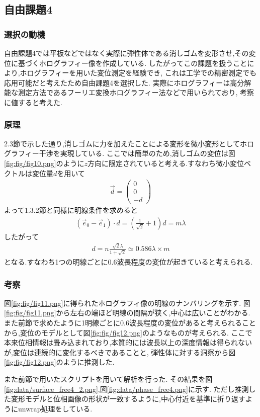 \subsection{自由課題4}
\subsubsection{選択の動機}
自由課題4では平板などではなく実際に弾性体である消しゴムを変形させ,その変位に基づくホログラフィー像を作成している.
したがってこの課題を扱うことにより,ホログラフィーを用いた変位測定を経験でき,
これは工学での精密測定でも応用可能だと考えたため自由課題4を選択した.
実際にホログラフィーは高分解能な測定方法であるフーリエ変換ホログラフィー法などで用いられており,
考察に値すると考えた.\cite{ja64:online}
\newpage
\subsubsection{原理}
2.3節で示した通り,消しゴムに力を加えたことによる変形を微小変形としてホログラフィー干渉を実現している.
ここでは簡単のため,消しゴムの変位は図\ref{fig:fig/fig10.png}のように$z$方向に限定されていると考える.すなわち微小変位ベクトルは変位量$d$を用いて
\begin{align}
  \vec{d}=\left(\begin{array}{c}
    0\\0\\-d
  \end{array}\right)
\end{align}
よって1.3.2節と同様に明線条件を求めると
\begin{align}
  (\vec{e}_0-\vec{e}_1)\cdot d=\left(\frac{1}{\sqrt{2}}+1\right)d=m\lambda
\end{align}
したがって
\begin{align}
  d=n\frac{\sqrt{2}\lambda}{1+\sqrt{2}}\simeq 0.586\lambda\times m  
\end{align}
となる.すなわち1つの明線ごとに$0.6$波長程度の変位が起きていると考えられる.
\subsubsection{考察}
図\ref{fig:fig/fig11.png}に得られたホログラフィ像の明線のナンバリングを示す.
図\ref{fig:fig/fig11.png}から左右の端ほど明線の間隔が狭く,中心は広いことがわかる.
また前節で求めたように1明線ごとに0.6波長程度の変位があると考えられることから,変位のモデルとして図\ref{fig:fig/fig12.png}のようなものが考えられる.
ここで本来位相情報は畳み込まれており,本質的には波長以上の深度情報は得られないが,変位は連続的に変化するべきであることと,
弾性体に対する洞察から図\ref{fig:fig/fig12.png}のように推測した.

また前節で用いたスクリプトを用いて解析を行った.
その結果を図\ref{fig:data/surface_free4_2.png},図\ref{fig:data/phase_free4.png}に示す.
ただし推測した変形モデルと位相画像の形状が一致するように,中心付近を基準に折り返すようにunwrap処理をしている.
